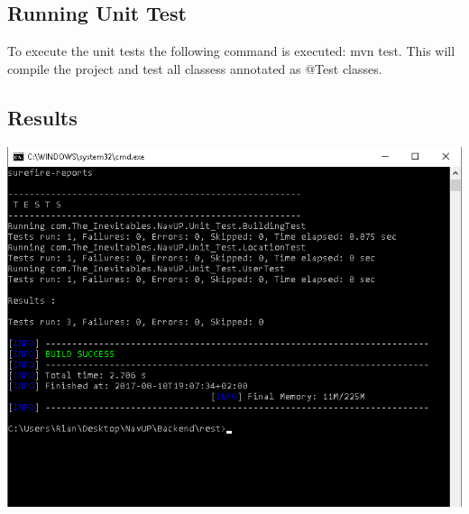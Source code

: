 \subsection{Running Unit Test}
To execute the unit tests the following command is executed: mvn test. This will compile the project and test all classess annotated as @Test classes.

\subsection{Results}
\includegraphics[]{backend/data/Backend_Unit_Tests.png}

